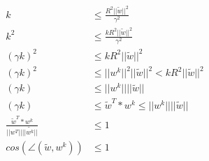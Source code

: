 \begin{align*}
	k &\le \frac{R^2 ||\tilde{w}||^2}{\gamma^2} \\
	k^2 &\le \frac{kR^2 ||\tilde{w}||^2 }{\gamma^2} \\
	(\gamma k)^2 &\le kR^2 ||\tilde{w}||^2 \\
	(\gamma k)^2 &\le ||w^k||^2 ||\tilde{w}||^2  < kR^2 ||\tilde{w}||^2 \\
	(\gamma k) &\le ||w^k|| ||\tilde{w}||  \\
	(\gamma k) &\le \tilde{w}^T * w^k \le ||w^k|| ||\tilde{w}||  \\
	\frac{\tilde{w}^T * w^k}{||w^T|| ||\tilde{w^k}||} &\le 1 \\
	cos(\angle (\tilde{w} , w^k) ) &\le 1
\end{align*}